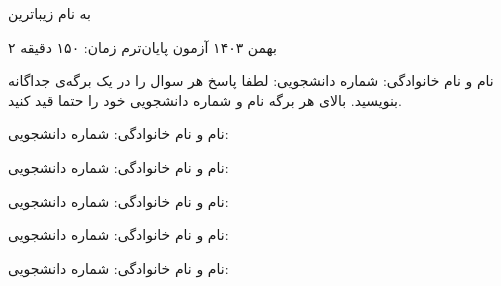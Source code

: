 
\usepackage{assets/template}
\newcommand{\hidesolutions}{}


{\centering به نام زیباترین}\\
	\def\ci{\perp\!\!\!\perp}

	\header
		{۲ بهمن ۱۴۰۳}
		{آزمون پایان‌ترم}
		{زمان: ۱۵۰ دقیقه}
		{}{}
	
\vspace{-3mm}
نام و نام خانوادگی: \hspace{8cm} شماره دانشجویی:
\hline
\vspace{2mm}
لطفا پاسخ هر سوال را در یک برگه‌ی جداگانه بنویسید. بالای هر برگه نام و شماره‌ دانشجویی خود را حتما قید کنید. 
\vspace{0.5cm}

\pagebreak
\hline
نام و نام خانوادگی: \hspace{8cm} شماره دانشجویی:
\hline
\vspace{0.5cm}

\pagebreak
\hline
نام و نام خانوادگی: \hspace{8cm} شماره دانشجویی:
\hline
\vspace{0.5cm}

\pagebreak
\hline
نام و نام خانوادگی: \hspace{8cm} شماره دانشجویی:
\hline
\vspace{0.5cm}

\pagebreak
\hline
نام و نام خانوادگی: \hspace{8cm} شماره دانشجویی:
\hline
\vspace{0.5cm}

\pagebreak
\hline
نام و نام خانوادگی: \hspace{8cm} شماره دانشجویی:
\hline
\vspace{0.5cm}


